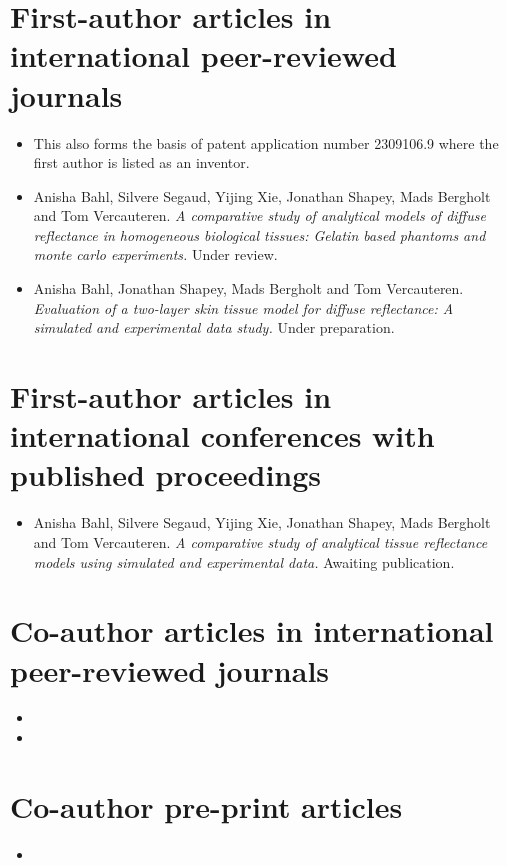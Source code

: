 \section*{First-author articles in international peer-reviewed journals}
\begin{itemize}
\item {} 

This also forms the basis of patent application number 2309106.9 where the first author is listed as an inventor.

\item Anisha Bahl, Silvere Segaud, Yijing Xie, Jonathan Shapey, Mads Bergholt and Tom Vercauteren. \textit{A comparative study of analytical models of diffuse reflectance in homogeneous biological tissues: Gelatin based phantoms and monte carlo experiments.} Under review.

\item Anisha Bahl, Jonathan Shapey, Mads Bergholt and Tom Vercauteren. \textit{Evaluation of a two-layer skin tissue model for diffuse reflectance:
A simulated and experimental data study.} Under preparation.
% 
\end{itemize}

\section*{First-author articles in international conferences with published proceedings}%
\begin{itemize}
\item Anisha Bahl, Silvere Segaud, Yijing Xie, Jonathan Shapey, Mads Bergholt and Tom Vercauteren. \textit{A comparative study of analytical tissue reflectance models
using simulated and experimental data.} Awaiting publication.
\end{itemize}

\section*{Co-author articles in international peer-reviewed journals}
\begin{itemize}
\item {}

\item {}
\end{itemize}

\section*{Co-author pre-print articles}
\begin{itemize}
\item {}
\end{itemize}
